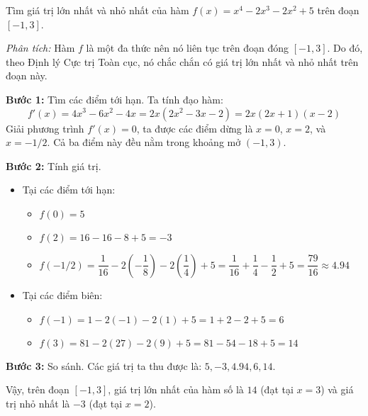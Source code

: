 \begin{example}
\label{ex:find-global-extrema-1}
Tìm giá trị lớn nhất và nhỏ nhất của hàm $f(x) = x^4 - 2x^3 - 2x^2 + 5$ trên đoạn $[-1, 3]$.

\textit{Phân tích:} Hàm $f$ là một đa thức nên nó liên tục trên đoạn đóng $[-1,3]$. Do đó, theo Định lý Cực trị Toàn cục, nó chắc chắn có giá trị lớn nhất và nhỏ nhất trên đoạn này.

\textbf{Bước 1:} Tìm các điểm tới hạn. Ta tính đạo hàm:
$$ f'(x) = 4x^3 - 6x^2 - 4x = 2x(2x^2 - 3x - 2) = 2x(2x+1)(x-2) $$
Giải phương trình $f'(x) = 0$, ta được các điểm dừng là $x=0$, $x=2$, và $x = -1/2$. Cả ba điểm này đều nằm trong khoảng mở $(-1,3)$.

\textbf{Bước 2:} Tính giá trị.
\begin{itemize}
    \item Tại các điểm tới hạn: 
        \begin{itemize}
            \item $f(0) = 5$
            \item $f(2) = 16 - 16 - 8 + 5 = -3$
            \item $f(-1/2) = \dfrac{1}{16} - 2(-\dfrac{1}{8}) - 2(\dfrac{1}{4}) + 5 = \dfrac{1}{16} + \dfrac{1}{4} - \dfrac{1}{2} + 5 = \dfrac{79}{16} \approx 4.94$
        \end{itemize}
    \item Tại các điểm biên:
        \begin{itemize}
            \item $f(-1) = 1 - 2(-1) - 2(1) + 5 = 1 + 2 - 2 + 5 = 6$
            \item $f(3) = 81 - 2(27) - 2(9) + 5 = 81 - 54 - 18 + 5 = 14$
        \end{itemize}
\end{itemize}

\textbf{Bước 3:} So sánh.
Các giá trị ta thu được là: $5, -3, 4.94, 6, 14$.

Vậy, trên đoạn $[-1,3]$, giá trị lớn nhất của hàm số là $14$ (đạt tại $x=3$) và giá trị nhỏ nhất là $-3$ (đạt tại $x=2$).
\end{example}

